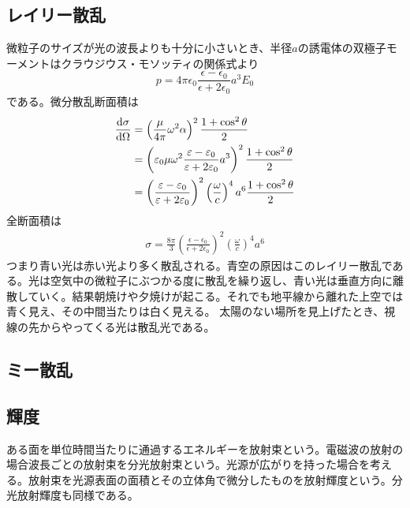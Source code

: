 \subsection{レイリー散乱}
    微粒子のサイズが光の波長よりも十分に小さいとき、半径$a$の誘電体の双極子モーメントはクラウジウス・モソッティの関係式より
        \[p = 4\pi\epsilon_0\frac{\epsilon - \epsilon_0}{\epsilon + 2\epsilon_0}a^3E_0\]
    である。微分散乱断面積は
    \begin{align*}
        \dv{\sigma}{\Omega}
            &= \left(\frac{\mu}{4\pi}\omega^2\alpha\right)^2 \frac{1 + \cos^2\theta}{2}\\
            &= \left(\varepsilon_0\mu\omega^2\frac{\varepsilon - \varepsilon_0}{\varepsilon + 2\varepsilon_0}a^3\right)^2 \frac{1 + \cos^2\theta}{2}\\
            &= \left(\frac{\varepsilon - \varepsilon_0}{\varepsilon + 2\varepsilon_0}\right)^2 \left(\frac{\omega}{c}\right)^4 a^6 \frac{1 + \cos^2\theta}{2}
    \end{align*}
    全断面積は
    \begin{align*}
        \sigma = \frac{8\pi}{3}\left(\frac{\epsilon - \epsilon_0}{\epsilon + 2\epsilon_0}\right)^2 \left(\frac{\omega}{c}\right)^4 a^6
    \end{align*}
    つまり青い光は赤い光より多く散乱される。青空の原因はこのレイリー散乱である。光は空気中の微粒子にぶつかる度に散乱を繰り返し、青い光は垂直方向に離散していく。結果朝焼けや夕焼けが起こる。それでも地平線から離れた上空では青く見え、その中間当たりは白く見える。
    太陽のない場所を見上げたとき、視線の先からやってくる光は散乱光である。

\subsection{ミー散乱}

\subsection{輝度}
    ある面を単位時間当たりに通過するエネルギーを放射束という。電磁波の放射の場合波長ごとの放射束を分光放射束という。光源が広がりを持った場合を考える。放射束を光源表面の面積とその立体角で微分したものを放射輝度という。分光放射輝度も同様である。